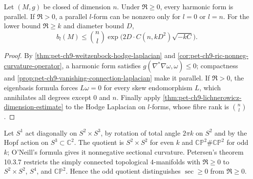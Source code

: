 \begin{theorem}
  \label{thm:pet-ch9-nonneg-curvature-operator-parallel-forms}

  Let $(M,g)$ be closed of dimension $n$.  Under $\mathfrak R\ge0$, every
  harmonic form is parallel.  If $\mathfrak R>0$, a parallel $l$-form can be
  nonzero only for $l=0$ or $l=n$.  For the lower bound $\mathfrak R\ge k$ and
  diameter bound $D$,
  \[
    b_l(M)\le\binom{n}{l}
      \exp\big(2D\cdot C(n,kD^2)\sqrt{-kC}\big).
  \]
\end{theorem}
\begin{proof}
  \sketch
  By \cref{thm:pet-ch9-weitzenbock-hodge-laplacian} and
  \cref{cor:pet-ch9-ric-nonneg-curvature-operator}, a harmonic form satisfies
  \(g(\nabla^*\nabla\omega,\omega)\le0\); compactness and
  \cref{prop:pet-ch9-vanishing-connection-laplacian} make it parallel.  If
  \(\mathfrak R>0\), the eigenbasis formula forces
  \(L\omega=0\) for every skew endomorphism \(L\), which annihilates all
  degrees except \(0\) and \(n\).  Finally apply
  \cref{thm:pet-ch9-lichnerowicz-dimension-estimate} to the Hodge Laplacian on
  \(l\)-forms, whose fibre rank is \(\binom nl\).
\end{proof}

\begin{example}
  \label{ex:pet-ch9-cp2-connect-sum-nonneg-curvature}

  Let $S^1$ act diagonally on $S^2\times S^3$, by rotation of total angle
  $2\pi k$ on $S^2$ and by the Hopf action on
  $S^3\subset\mathbb C^2$.  The quotient is $S^2\times S^2$ for even $k$ and
  $\mathbb{CP}^2\#\mathbb{CP}^2$ for odd $k$; O'Neill's formula gives it
  nonnegative sectional curvature.  Petersen's theorem 10.3.7 restricts the
  simply connected topological $4$-manifolds with $\mathfrak R\ge0$ to
  $S^2\times S^2$, $S^4$, and $\mathbb{CP}^2$.  Hence the odd quotient
  distinguishes $\sec\ge0$ from $\mathfrak R\ge0$.
\end{example}

